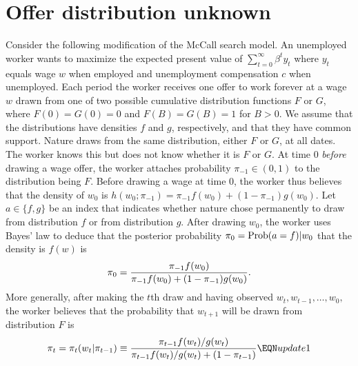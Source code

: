 \section{Offer distribution unknown}\label{sec:Offer_distribution}%
Consider the following modification of the McCall search model.
An unemployed worker wants to maximize the expected present value of
$\sum_{t=0}^\infty \beta^t y_t$ where $y_t$ equals wage $w$ when employed and unemployment compensation $c$ when unemployed.
Each period the worker receives one  offer to work forever at a wage $w$ drawn  from one of two possible 
 cumulative distribution functions $F$ or $G$, where $F(0)=G(0) = 0$ and $F(B) = G(B) = 1$ for $B > 0$. We assume that the distributions have densities $f$ and $g$, respectively, and that they have common support.
Nature draws from the same distribution, either $F$ or $G$, at all dates. The worker knows this but does not know whether it is $F$ or $G$.
 At time $0$ {\it before\/} drawing a wage offer, the worker attaches probability $\pi_{-1} \in (0,1)$ to the distribution being
 $F$.  
Before drawing a wage at time $0$, the  worker thus believes that the density of $w_0$
is $h(w_0;\pi_{-1}) = \pi_{-1} f(w_0) + (1-\pi_{-1}) g(w_0) $.  Let $a \in \{ f, g\} $ be an index that indicates whether  nature chose permanently to draw from distribution $f$ or from distribution $g$. After drawing $w_0$, the worker uses Bayes' law to deduce that
the posterior  probability $\pi_0 = {\rm Prob}{(a = f) | w_0} $
 that the density is $f(w)$ is%
$$\pi_0 = { \pi_{-1} f(w_0) \over \pi_{-1} f(w_0) + (1-\pi_{-1}) g(w_0)} .$$
More generally,  after making the $t$th draw and having   observed   $w_t, w_{t-1}, \ldots, w_0,$ the worker believes that
the probability that $w_{t+1}$ will  be drawn from  distribution  $F$ is
$$ \pi_t = \pi_t(w_t | \pi_{t-1}) \equiv { \pi_{t-1} f(w_t)/g(w_t) \over \pi_{t-1} f(w_t)/g(w_t) + (1-\pi_{t-1})} \EQN update1 $$
